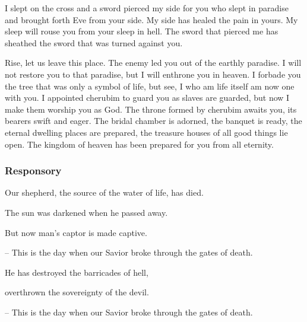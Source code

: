 I slept on the cross and a sword pierced my side for you who slept in paradise and brought forth Eve from your side. My side has healed the pain in yours. My sleep will rouse you from your sleep in hell. The sword that pierced me has sheathed the sword that was turned against you.

Rise, let us leave this place. The enemy led you out of the earthly paradise. I will not restore you to that paradise, but I will enthrone you in heaven. I forbade you the tree that was only a symbol of life, but see, I who am life itself am now one with you. I appointed cherubim to guard you as slaves are guarded, but now I make them worship you as God. The throne formed by cherubim awaits you, its bearers swift and eager. The bridal chamber is adorned, the banquet is ready, the eternal dwelling places are prepared, the treasure houses of all good things lie open. The kingdom of heaven has been prepared for you from all eternity.

\subsubsection{Responsory}

\hfill 

Our shepherd, the source of the water of life, has died.\par
The sun was darkened when he passed away.\par
But now man’s captor is made captive.\par
– This is the day when our Savior broke through the gates of death.

\vspace{5pt}

He has destroyed the barricades of hell,\par
overthrown the sovereignty of the devil.\par
– This is the day when our Savior broke through the gates of death.